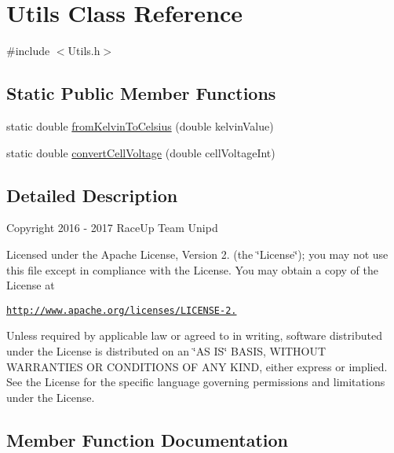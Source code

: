 \hypertarget{class_utils}{}\section{Utils Class Reference}
\label{class_utils}


{\ttfamily \#include $<$Utils.\+h$>$}

\subsection*{Static Public Member Functions}
\begin{DoxyCompactItemize}
\item 
static double \hyperlink{class_utils_a393f44e0230724e5cd3b7c125b16b5e1}{from\+Kelvin\+To\+Celsius} (double kelvin\+Value)
\item 
static double \hyperlink{class_utils_a70e2b7f69e19a166352387194f83a13c}{convert\+Cell\+Voltage} (double cell\+Voltage\+Int)
\end{DoxyCompactItemize}


\subsection{Detailed Description}
Copyright 2016 -\/ 2017 Race\+Up Team Unipd

Licensed under the Apache License, Version 2. (the \char`\"{}\+License\char`\"{}); you may not use this file except in compliance with the License. You may obtain a copy of the License at

\href{http://www.apache.org/licenses/LICENSE-2.0}{\tt http\+://www.\+apache.\+org/licenses/\+L\+I\+C\+E\+N\+S\+E-\/2.}

Unless required by applicable law or agreed to in writing, software distributed under the License is distributed on an \char`\"{}\+A\+S I\+S\char`\"{} B\+A\+S\+IS, W\+I\+T\+H\+O\+UT W\+A\+R\+R\+A\+N\+T\+I\+ES OR C\+O\+N\+D\+I\+T\+I\+O\+NS OF A\+NY K\+I\+ND, either express or implied. See the License for the specific language governing permissions and limitations under the License. 

\subsection{Member Function Documentation}
